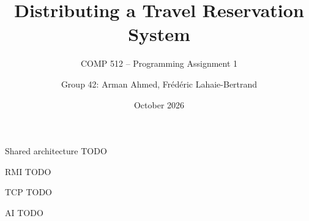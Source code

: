 \documentclass{beamer}
\title{Distributing a Travel Reservation System}
\subtitle{COMP 512 -- Programming Assignment 1}
\author{Group 42: Arman Ahmed, Frédéric Lahaie-Bertrand}
\date{October 2026}
\begin{document}
\maketitle

\begin{frame}{Shared architecture}
  TODO
\end{frame}

\begin{frame}{RMI}
  TODO
\end{frame}

\begin{frame}{TCP}
  TODO
\end{frame}

\begin{frame}{AI}
  TODO
\end{frame}
\end{document}
